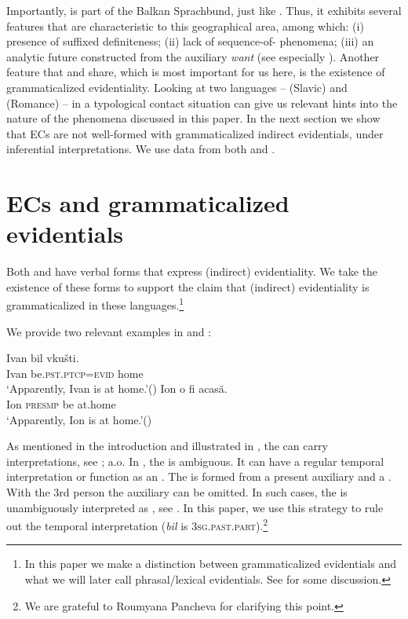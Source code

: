 \documentclass[output=paper,colorlinks,citecolor=brown,newtxmath]{langsci/langscibook}
\begin{document}
\noindent Importantly,  is part of the Balkan Sprachbund, just like . Thus, it exhibits several features that are characteristic to this geographical area, among which: (i) presence of suffixed definiteness; (ii) lack of sequence-of- phenomena; (iii) an analytic future constructed from the auxiliary \textit{want} (see especially \citealt{mistom06}). Another feature that  and  share, which is most important for us here, is the existence of grammaticalized evidentiality. Looking at two languages --  (Slavic) and  (Romance) -- in a typological contact situation can give us relevant hints into the nature of the phenomena discussed in this paper. In the next section we show that ECs are not well-formed  with grammaticalized indirect evidentials, under inferential interpretations. We use data from both  and .



\section{ECs and grammaticalized evidentials} \label{ECsIIEV}
Both  and  have verbal forms that express (indirect) evidentiality. We take the existence of these forms to support the claim that (indirect) evidentiality is grammaticalized in these languages.\footnote{In this paper we make a distinction between grammaticalized evidentials and what we will later call phrasal/lexical evidentials. See  for some discussion.}

We provide two relevant examples in  and :

	\ea \ea \gll Ivan bil vkušti. \\
		Ivan be.\textsc{pst.ptcp=evid} home \\
		\glt `Apparently, Ivan is at home.'\hfill () \label{bulevid}
    \ex \gll Ion o fi acasă. \\
 		Ion \textsc{presmp} be at.home \\
		\glt `Apparently, Ion is at home.'\hfill () \label{romevid}
        \z \z

\noindent As mentioned in the introduction and illustrated in , the   can carry  interpretations, see \citet{jakob156,comrie76,palmer86,izv97,alexetal03,mistom06b}; a.o. In , the  is ambiguous. It can have a regular temporal interpretation or function as an . The  is formed from a present auxiliary and a . With the 3rd person the auxiliary can be omitted. In such cases, the  is unambiguously interpreted as , see \cite[fn. 7]{izv97}. In this paper, we use this strategy to rule out the temporal interpretation (\textit{bil} is \textsc{3sg.past.part}).\footnote{We are grateful to Roumyana Pancheva for clarifying this point.}
\end{document}
